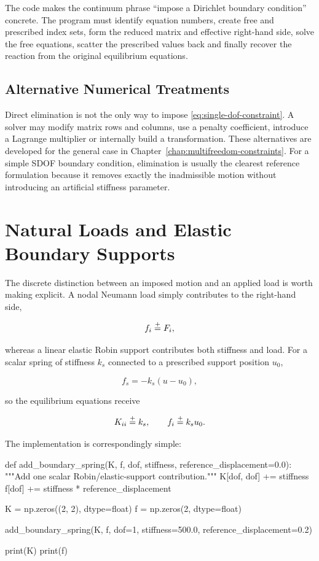 The code makes the continuum phrase ``impose a Dirichlet boundary condition''
concrete. The program must identify equation numbers, create free and prescribed
index sets, form the reduced matrix and effective right-hand side, solve the
free equations, scatter the prescribed values back and finally recover the
reaction from the original equilibrium equations.

\subsection{Alternative Numerical Treatments}

Direct elimination is not the only way to impose
\eqref{eq:single-dof-constraint}. A solver may modify matrix rows and columns,
use a penalty coefficient, introduce a Lagrange multiplier or internally build
a transformation. These alternatives are developed for the general case in
Chapter~\ref{chap:multifreedom-constraints}. For a simple SDOF boundary
condition, elimination is usually the clearest reference formulation because it
removes exactly the inadmissible motion without introducing an artificial
stiffness parameter.

\section{Natural Loads and Elastic Boundary Supports}

The discrete distinction between an imposed motion and an applied load is worth
making explicit. A nodal Neumann load simply contributes to the right-hand side,

\begin{equation}
    f_i\stackrel{+}{=} F_i,
\end{equation}

whereas a linear elastic Robin support contributes both stiffness and load. For
a scalar spring of stiffness $k_s$ connected to a prescribed support position
$u_0$,

\begin{equation}
    f_s=-k_s(u-u_0),
\end{equation}

so the equilibrium equations receive

\begin{equation}
    K_{ii}\stackrel{+}{=} k_s,
    \qquad
    f_i\stackrel{+}{=} k_su_0.
\end{equation}

The implementation is correspondingly simple:

\begin{python}
def add_boundary_spring(K, f, dof, stiffness, reference_displacement=0.0):
    """Add one scalar Robin/elastic-support contribution."""
    K[dof, dof] += stiffness
    f[dof] += stiffness * reference_displacement


K = np.zeros((2, 2), dtype=float)
f = np.zeros(2, dtype=float)

add_boundary_spring(K, f, dof=1, stiffness=500.0,
                    reference_displacement=0.2)

print(K)
print(f)
\end{python}

